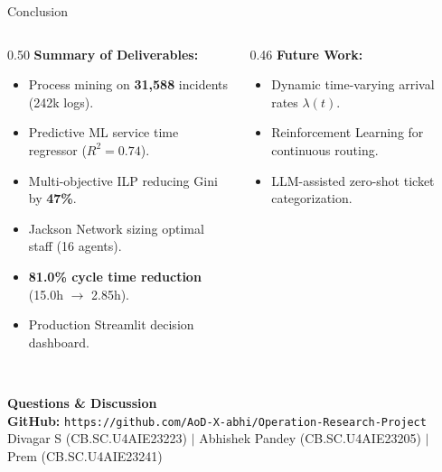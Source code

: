 \documentclass[10pt,aspectratio=169]{beamer}
\begin{document}
\begin{frame}{Conclusion}
    \begin{columns}[c]
        \begin{column}{0.50\textwidth}
            \textbf{Summary of Deliverables:}
            \vspace{0.2cm}
            \begin{itemize}
                \setlength\itemsep{0.5em}
                \item Process mining on \textbf{31,588} incidents (242k logs).
                \item Predictive ML service time regressor ($R^2=0.74$).
                \item Multi-objective ILP reducing Gini by \textbf{47\%}.
                \item Jackson Network sizing optimal staff (16 agents).
                \item \textbf{81.0\% cycle time reduction} (15.0h $\to$ 2.85h).
                \item Production Streamlit decision dashboard.
            \end{itemize}
        \end{column}
        \begin{column}{0.46\textwidth}
            \textbf{Future Work:}
            \vspace{0.2cm}
            \begin{itemize}
                \setlength\itemsep{0.5em}
                \item Dynamic time-varying arrival rates $\lambda(t)$.
                \item Reinforcement Learning for continuous routing.
                \item LLM-assisted zero-shot ticket categorization.
            \end{itemize}
        \end{column}
    \end{columns}
\end{frame}

\begin{frame}
    \centering
    \vspace{0.8cm}
    \Huge \textbf{\color{primaryblue}{Thank You}} \\
    \vspace{0.4cm}
    \Large \textbf{Questions \& Discussion} \\
    \vspace{0.6cm}
    \small
    \textbf{GitHub:} \texttt{https://github.com/AoD-X-abhi/Operation-Research-Project} \\
    \vspace{0.2cm}
    \footnotesize
    Divagar S (CB.SC.U4AIE23223) \quad $\vert$ \quad Abhishek Pandey (CB.SC.U4AIE23205) \quad $\vert$ \quad Prem (CB.SC.U4AIE23241)
\end{frame}
\end{document}

